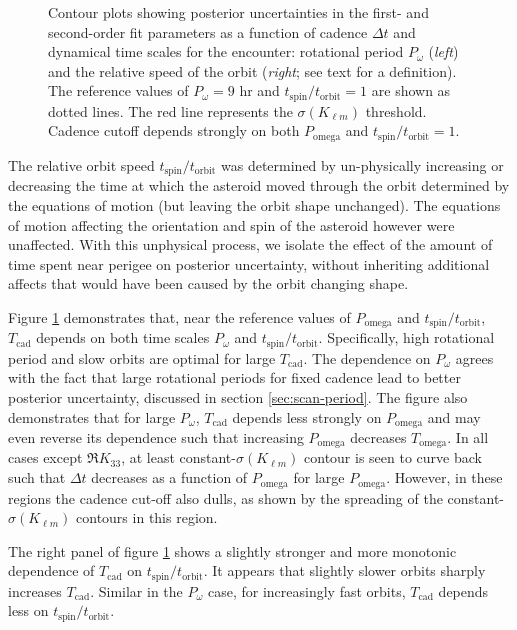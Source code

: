 \begin{figure}
  \caption{Contour plots showing posterior uncertainties in the first- and second-order fit parameters as a function of cadence $\Delta t$ and dynamical time scales for the encounter: rotational period $P_\omega$ (\textit{left}) and the relative speed of the orbit (\textit{right}; see text for a definition). The reference values of $P_\omega=9$ hr and $t_\text{spin}/t_\text{orbit}=1$ are shown as dotted lines. The red line represents the $\sigma(K_{\ell m})$ threshold. Cadence cutoff depends strongly on both $P_\text{omega}$ and $t_\text{spin}/t_\text{orbit}=1$.}
  \label{fig:cad-contour}
\end{figure}

The relative orbit speed $t_\text{spin} / t_\text{orbit}$ was determined by un-physically increasing or decreasing the time at which the asteroid moved through the orbit determined by the equations of motion (but leaving the orbit shape unchanged). The equations of motion affecting the orientation and spin of the asteroid however were unaffected. With this unphysical process, we isolate the effect of the amount of time spent near perigee on posterior uncertainty, without inheriting additional affects that would have been caused by the orbit changing shape.

Figure \ref{fig:cad-contour} demonstrates that, near the reference values of $P_\text{omega}$ and $t_\text{spin} / t_\text{orbit}$, $T_\text{cad}$ depends on both time scales $P_\omega$ and $t_\text{spin} / t_\text{orbit}$. Specifically, high rotational period and slow orbits are optimal for large $T_\text{cad}$. The dependence on $P_\omega$ agrees with the fact that large rotational periods for fixed cadence lead to better posterior uncertainty, discussed in section \ref{sec:scan-period}. The figure also demonstrates that for large $P_\omega$, $T_\text{cad}$ depends less strongly on $P_\text{omega}$ and may even reverse its dependence such that increasing $P_\text{omega}$ decreases $T_\text{omega}$. In all cases except $\Re K_{33}$, at least constant-$\sigma(K_{\ell m})$ contour is seen to curve back such that $\Delta t$ decreases as a function of $P_\text{omega}$ for large $P_\text{omega}$. However, in these regions the cadence cut-off also dulls, as shown by the spreading of the constant-$\sigma(K_{\ell m})$ contours in this region.

The right panel of figure \ref{fig:cad-contour} shows a slightly stronger and more monotonic dependence of $T_\text{cad}$ on $t_\text{spin} / t_\text{orbit}$. It appears that slightly slower orbits sharply increases $T_\text{cad}$. Similar in the $P_\omega$ case, for increasingly fast orbits, $T_\text{cad}$ depends less on $t_\text{spin}/ t_\text{orbit}$. 

